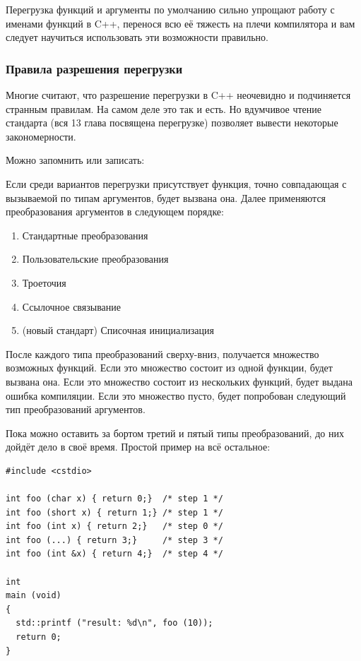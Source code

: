 \documentclass[a4paper,12pt,oneside]{article}
\begin{document}
Перегрузка функций и аргументы по умолчанию сильно упрощают работу с именами функций в C++, перенося всю её тяжесть на плечи компилятора и вам следует научиться использовать эти возможности правильно.

\subsubsection{Правила разрешения перегрузки}\label{Overloading}

Многие считают, что разрешение перегрузки в C++ неочевидно и подчиняется странным правилам. На самом деле это так и есть. Но вдумчивое чтение стандарта (вся 13 глава посвящена перегрузке) позволяет вывести некоторые закономерности. 

Можно запомнить или записать:

Если среди вариантов перегрузки присутствует функция, точно совпадающая с вызываемой по типам аргументов, будет вызвана она. Далее применяются преобразования аргументов в следующем порядке:

\begin{enumerate}
\item Стандартные преобразования
\item Пользовательские преобразования
\item Троеточия
\item Ссылочное связывание
\item (новый стандарт) Списочная инициализация
\end{enumerate}

После каждого типа преобразований сверху-вниз, получается множество возможных функций. Если это множество состоит из одной функции, будет вызвана она. Если это множество состоит из нескольких функций, будет выдана ошибка компиляции. Если это множество пусто, будет попробован следующий тип преобразований аргументов.

Пока можно оставить за бортом третий и пятый типы преобразований, до них дойдёт дело в своё время. Простой пример на всё остальное:

\begin{lstlisting}
#include <cstdio>

int foo (char x) { return 0;}  /* step 1 */
int foo (short x) { return 1;} /* step 1 */
int foo (int x) { return 2;}   /* step 0 */
int foo (...) { return 3;}     /* step 3 */
int foo (int &x) { return 4;}  /* step 4 */

int
main (void)
{
  std::printf ("result: %d\n", foo (10));
  return 0;
}
\end{lstlisting}
\end{document}
